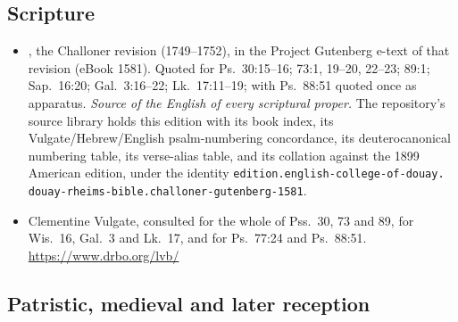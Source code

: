 \subsection*{Scripture}

\begin{itemize}[leftmargin=1.2em, itemsep=0.15em]
\item {}, the Challoner revision
(1749--1752), in the Project Gutenberg e-text of that revision (eBook 1581).
Quoted for Ps.\ 30:15--16; 73:1, 19--20, 22--23; 89:1; Sap.\ 16:20; Gal.\
3:16--22; Lk.\ 17:11--19; with Ps.\ 88:51 quoted once as apparatus.
\textit{Source of the English of every scriptural proper.} The repository's
source library holds this edition with its book index, its
Vulgate/Hebrew/English psalm-numbering concordance, its deuterocanonical
numbering table, its verse-alias table, and its collation against the 1899
American edition, under the identity
\texttt{edition.english-college-of-douay.\allowbreak
douay-rheims-bible.\allowbreak challoner-gutenberg-1581}.
\item Clementine Vulgate, consulted for the whole of Pss.\ 30, 73 and 89, for
Wis.\ 16, Gal.\ 3 and Lk.\ 17, and for Ps.\ 77:24 and Ps.\ 88:51.
\url{https://www.drbo.org/lvb/}
\end{itemize}

\subsection*{Patristic, medieval and later reception}

